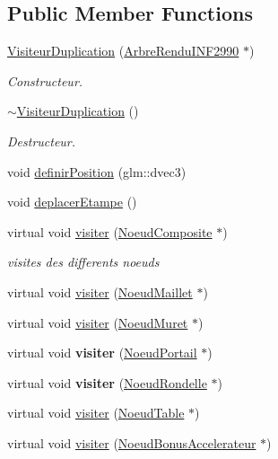 \subsection*{Public Member Functions}
\begin{DoxyCompactItemize}
\item 
\hyperlink{group__inf2990_gab7f16d7325839d400df6da191430fbd8}{Visiteur\+Duplication} (\hyperlink{class_arbre_rendu_i_n_f2990}{Arbre\+Rendu\+I\+N\+F2990} $\ast$)
\begin{DoxyCompactList}\small\item\em Constructeur. \end{DoxyCompactList}\item 
\hyperlink{group__inf2990_gab48c0bd69fe4738d85ec48bfe1ae51ea}{$\sim$\+Visiteur\+Duplication} ()
\begin{DoxyCompactList}\small\item\em Destructeur. \end{DoxyCompactList}\item 
void \hyperlink{group__inf2990_ga1482d7144bc781ddbef06292573872a8}{definir\+Position} (glm\+::dvec3)
\item 
void \hyperlink{group__inf2990_ga44443631965b05df20db383d723765e2}{deplacer\+Etampe} ()
\item 
virtual void \hyperlink{group__inf2990_gaa66f13da730ff20959fd4c7b24c2c6ea}{visiter} (\hyperlink{class_noeud_composite}{Noeud\+Composite} $\ast$)
\begin{DoxyCompactList}\small\item\em visites des differents noeuds \end{DoxyCompactList}\item 
virtual void \hyperlink{group__inf2990_ga0300496a83fea5642c06b86fce6cd17e}{visiter} (\hyperlink{class_noeud_maillet}{Noeud\+Maillet} $\ast$)
\item 
virtual void \hyperlink{group__inf2990_ga03689e8ff1b47c750834eb2d593b8fcf}{visiter} (\hyperlink{class_noeud_muret}{Noeud\+Muret} $\ast$)
\item 
virtual void {\bfseries visiter} (\hyperlink{class_noeud_portail}{Noeud\+Portail} $\ast$)
\item 
virtual void {\bfseries visiter} (\hyperlink{class_noeud_rondelle}{Noeud\+Rondelle} $\ast$)
\item 
virtual void \hyperlink{group__inf2990_gab0e86c310bdfeeddf6787dc8a25030ef}{visiter} (\hyperlink{class_noeud_table}{Noeud\+Table} $\ast$)
\item 
virtual void \hyperlink{group__inf2990_ga5b7fa1f39c02f49042935a785e35df06}{visiter} (\hyperlink{class_noeud_bonus_accelerateur}{Noeud\+Bonus\+Accelerateur} $\ast$)
\end{DoxyCompactItemize}
